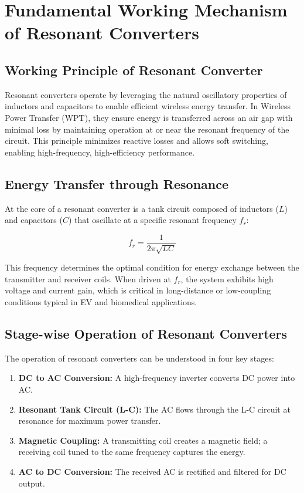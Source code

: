 \documentclass[12pt,a4paper]{report}
\begin{document}

\chapter{Fundamental Working Mechanism of Resonant Converters}
\vspace{1cm}
\section{Working Principle of Resonant Converter}


\quad Resonant converters operate by leveraging the natural oscillatory properties of inductors and capacitors to enable efficient wireless energy transfer. In Wireless Power Transfer (WPT), they ensure energy is transferred across an air gap with minimal loss by maintaining operation at or near the resonant frequency of the circuit. This principle minimizes reactive losses and allows soft switching, enabling high-frequency, high-efficiency performance.\cite{erickson2020resonant}\cite{li2022singleended}

\section{Energy Transfer through Resonance}
\quad At the core of a resonant converter is a tank circuit composed of inductors ($L$) and capacitors ($C$) that oscillate at a specific resonant frequency $f_r$:

\begin{equation}
    f_r = \frac{1}{2\pi\sqrt{LC}}
\end{equation}

This frequency determines the optimal condition for energy exchange between the transmitter and receiver coils. When driven at $f_r$, the system exhibits high voltage and current gain, which is critical in long-distance or low-coupling conditions typical in EV and biomedical applications.\cite{choi2020resonant}

\section{Stage-wise Operation of Resonant Converters}
\quad The operation of resonant converters can be understood in four key stages:\cite{erickson2020resonant}\cite{li2022singleended}\cite{bertolini2021frequency}

\begin{enumerate}
    \item \textbf{DC to AC Conversion:} A high-frequency inverter converts DC power into AC.
    \item \textbf{Resonant Tank Circuit (L-C):} The AC flows through the L-C circuit at resonance for maximum power transfer.
    \item \textbf{Magnetic Coupling:} A transmitting coil creates a magnetic field; a receiving coil tuned to the same frequency captures the energy.
    \item \textbf{AC to DC Conversion:} The received AC is rectified and filtered for DC output.
\end{enumerate}
\end{document}
